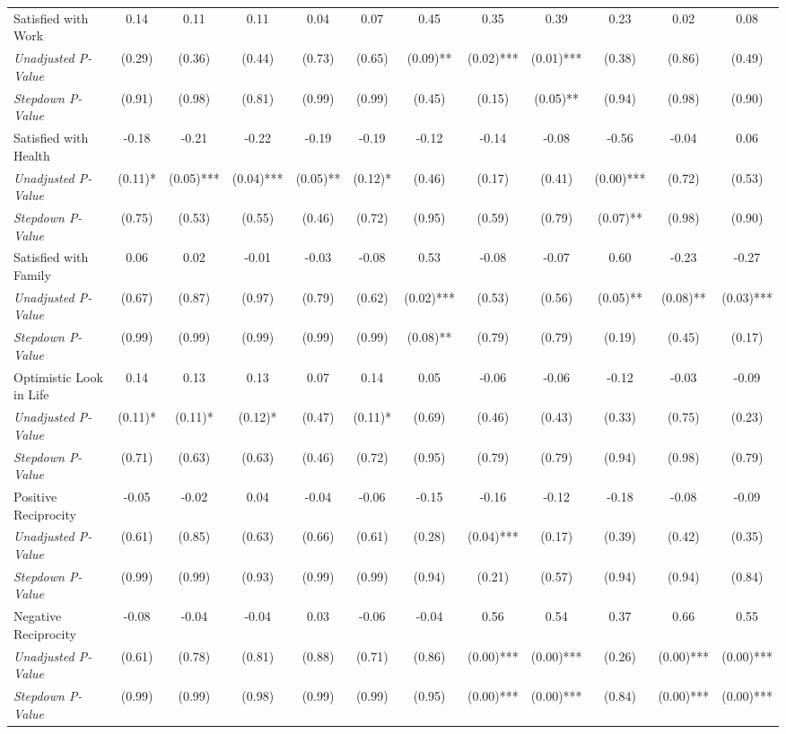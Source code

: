\begin{tabular}{l c c c c c c c c c c c}
Satisfied with Work & 0.14 & 0.11 & 0.11 & 0.04 & 0.07 & 0.45 & 0.35 & 0.39 & 0.23 & 0.02 & 0.08 \\
\quad \textit{Unadjusted P-Value} & (0.29) & (0.36) & (0.44) & (0.73) & (0.65) & (0.09)** & (0.02)*** & (0.01)*** & (0.38) & (0.86) & (0.49) \\
\quad \textit{Stepdown P-Value} & (0.91) & (0.98) & (0.81) & (0.99) & (0.99) & (0.45) & (0.15) & (0.05)** & (0.94) & (0.98) & (0.90) \\
Satisfied with Health & -0.18 & -0.21 & -0.22 & -0.19 & -0.19 & -0.12 & -0.14 & -0.08 & -0.56 & -0.04 & 0.06 \\
\quad \textit{Unadjusted P-Value} & (0.11)* & (0.05)*** & (0.04)*** & (0.05)** & (0.12)* & (0.46) & (0.17) & (0.41) & (0.00)*** & (0.72) & (0.53) \\
\quad \textit{Stepdown P-Value} & (0.75) & (0.53) & (0.55) & (0.46) & (0.72) & (0.95) & (0.59) & (0.79) & (0.07)** & (0.98) & (0.90) \\
Satisfied with Family & 0.06 & 0.02 & -0.01 & -0.03 & -0.08 & 0.53 & -0.08 & -0.07 & 0.60 & -0.23 & -0.27 \\
\quad \textit{Unadjusted P-Value} & (0.67) & (0.87) & (0.97) & (0.79) & (0.62) & (0.02)*** & (0.53) & (0.56) & (0.05)** & (0.08)** & (0.03)*** \\
\quad \textit{Stepdown P-Value} & (0.99) & (0.99) & (0.99) & (0.99) & (0.99) & (0.08)** & (0.79) & (0.79) & (0.19) & (0.45) & (0.17) \\
Optimistic Look in Life & 0.14 & 0.13 & 0.13 & 0.07 & 0.14 & 0.05 & -0.06 & -0.06 & -0.12 & -0.03 & -0.09 \\
\quad \textit{Unadjusted P-Value} & (0.11)* & (0.11)* & (0.12)* & (0.47) & (0.11)* & (0.69) & (0.46) & (0.43) & (0.33) & (0.75) & (0.23) \\
\quad \textit{Stepdown P-Value} & (0.71) & (0.63) & (0.63) & (0.46) & (0.72) & (0.95) & (0.79) & (0.79) & (0.94) & (0.98) & (0.79) \\
Positive Reciprocity & -0.05 & -0.02 & 0.04 & -0.04 & -0.06 & -0.15 & -0.16 & -0.12 & -0.18 & -0.08 & -0.09 \\
\quad \textit{Unadjusted P-Value} & (0.61) & (0.85) & (0.63) & (0.66) & (0.61) & (0.28) & (0.04)*** & (0.17) & (0.39) & (0.42) & (0.35) \\
\quad \textit{Stepdown P-Value} & (0.99) & (0.99) & (0.93) & (0.99) & (0.99) & (0.94) & (0.21) & (0.57) & (0.94) & (0.94) & (0.84) \\
Negative Reciprocity & -0.08 & -0.04 & -0.04 & 0.03 & -0.06 & -0.04 & 0.56 & 0.54 & 0.37 & 0.66 & 0.55 \\
\quad \textit{Unadjusted P-Value} & (0.61) & (0.78) & (0.81) & (0.88) & (0.71) & (0.86) & (0.00)*** & (0.00)*** & (0.26) & (0.00)*** & (0.00)*** \\
\quad \textit{Stepdown P-Value} & (0.99) & (0.99) & (0.98) & (0.99) & (0.99) & (0.95) & (0.00)*** & (0.00)*** & (0.84) & (0.00)*** & (0.00)*** \\
\bottomrule
\end{tabular}
